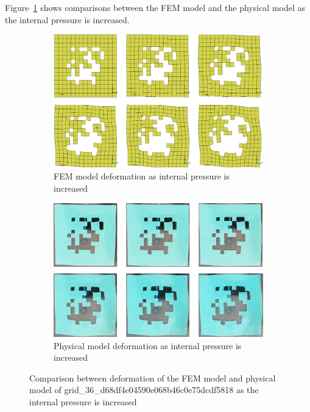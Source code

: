 Figure~\ref{fig:unit1def} shows comparisons between the FEM model and the physical model as the internal pressure is increased.

\begin{figure}[H]
	\centering
	\begin{subfigure}[c]{\textwidth}
		\centering
		\includegraphics[width=\textwidth]{unit1deffem.png}
		\caption{FEM model deformation as internal pressure is increased}
	\end{subfigure}
	\hfill
	\begin{subfigure}[c]{\textwidth}
		\centering
		\includegraphics[width=\textwidth]{unit1defmod.png}
		\caption{Physical model deformation as internal pressure is increased}
	\end{subfigure}
	\caption[Comparison between FEM and physical models of unit 1]{Comparison between deformation of the FEM model and physical model of grid\_36\_d68df4e04590e068b46c0e75dcdf5818 as the internal pressure is increased}
	\label{fig:unit1def}
\end{figure}

